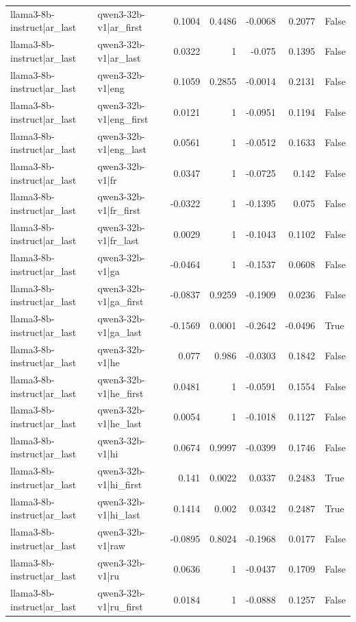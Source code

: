 \begin{table}
\begin{tabular}{l l r r r r l}
llama3-8b-instruct|ar_last & qwen3-32b-v1|ar_first & 0.1004 & 0.4486 & -0.0068 & 0.2077 & False \\
llama3-8b-instruct|ar_last & qwen3-32b-v1|ar_last & 0.0322 & 1 & -0.075 & 0.1395 & False \\
llama3-8b-instruct|ar_last & qwen3-32b-v1|eng & 0.1059 & 0.2855 & -0.0014 & 0.2131 & False \\
llama3-8b-instruct|ar_last & qwen3-32b-v1|eng_first & 0.0121 & 1 & -0.0951 & 0.1194 & False \\
llama3-8b-instruct|ar_last & qwen3-32b-v1|eng_last & 0.0561 & 1 & -0.0512 & 0.1633 & False \\
llama3-8b-instruct|ar_last & qwen3-32b-v1|fr & 0.0347 & 1 & -0.0725 & 0.142 & False \\
llama3-8b-instruct|ar_last & qwen3-32b-v1|fr_first & -0.0322 & 1 & -0.1395 & 0.075 & False \\
llama3-8b-instruct|ar_last & qwen3-32b-v1|fr_last & 0.0029 & 1 & -0.1043 & 0.1102 & False \\
llama3-8b-instruct|ar_last & qwen3-32b-v1|ga & -0.0464 & 1 & -0.1537 & 0.0608 & False \\
llama3-8b-instruct|ar_last & qwen3-32b-v1|ga_first & -0.0837 & 0.9259 & -0.1909 & 0.0236 & False \\
llama3-8b-instruct|ar_last & qwen3-32b-v1|ga_last & -0.1569 & 0.0001 & -0.2642 & -0.0496 & True \\
llama3-8b-instruct|ar_last & qwen3-32b-v1|he & 0.077 & 0.986 & -0.0303 & 0.1842 & False \\
llama3-8b-instruct|ar_last & qwen3-32b-v1|he_first & 0.0481 & 1 & -0.0591 & 0.1554 & False \\
llama3-8b-instruct|ar_last & qwen3-32b-v1|he_last & 0.0054 & 1 & -0.1018 & 0.1127 & False \\
llama3-8b-instruct|ar_last & qwen3-32b-v1|hi & 0.0674 & 0.9997 & -0.0399 & 0.1746 & False \\
llama3-8b-instruct|ar_last & qwen3-32b-v1|hi_first & 0.141 & 0.0022 & 0.0337 & 0.2483 & True \\
llama3-8b-instruct|ar_last & qwen3-32b-v1|hi_last & 0.1414 & 0.002 & 0.0342 & 0.2487 & True \\
llama3-8b-instruct|ar_last & qwen3-32b-v1|raw & -0.0895 & 0.8024 & -0.1968 & 0.0177 & False \\
llama3-8b-instruct|ar_last & qwen3-32b-v1|ru & 0.0636 & 1 & -0.0437 & 0.1709 & False \\
llama3-8b-instruct|ar_last & qwen3-32b-v1|ru_first & 0.0184 & 1 & -0.0888 & 0.1257 & False \\

\end{tabular}
\end{table}
